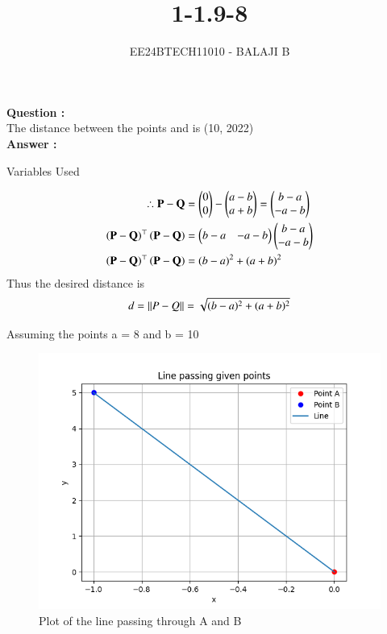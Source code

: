 \documentclass[journal]{IEEEtran}
\begin{document}

\vspace{3cm}

\title{1-1.9-8}
\author{EE24BTECH11010 - BALAJI B
}
{\let\newpage\relax\maketitle}

\renewcommand{\thefigure}{\theenumi}
\renewcommand{\thetable}{\theenumi}
\setlength{\intextsep}{10pt} %


\renewcommand{\thetable}{\theenumi}

\textbf{Question :} \\ 
The distance between the points  and  is  \hfill(10, 2022) \\

\textbf{Answer :} \\

\begin{table}[h!]    
  \centering
  
  \caption{Variables Used}
  \label{tab1.9.19.1}
\end{table}

\begin{align}
    \therefore\mathbf{P} - \mathbf{Q} &= \begin{pmatrix}0 \\ 0 \end{pmatrix} - \begin{pmatrix}a - b \\ a + b\end{pmatrix} = \begin{pmatrix}b - a \\ -a -b\end{pmatrix} \\
    \left(\mathbf{P - Q}\right)^\top \left(\mathbf{P - Q}\right) &= \begin{pmatrix}b-a & -a-b\end{pmatrix}\begin{pmatrix}b-a \\ -a-b\end{pmatrix} \\
    \left(\mathbf{P - Q}\right)^\top \left(\mathbf{P - Q}\right) &= (b - a)^2 + (a + b)^2
\end{align} 
Thus the desired distance is \\

\begin{align}
    d = \left\lVert P - Q\right\rVert = \sqrt{(b - a)^2 + (a + b)^2}
\end{align}

\newpage
Assuming the points a = 8 and b = 10 \\
\begin{figure}[h!]
   \centering
   \includegraphics[width=0.7\linewidth]{figs/fig.png}
   \caption{Plot of the line passing through A and B}
   \label{stemplot}
\end{figure}
\end{document}
